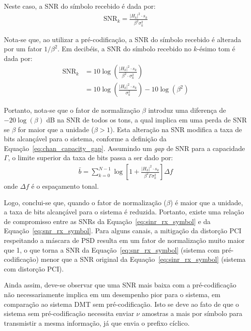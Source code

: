 Neste caso, a SNR do símbolo recebido é dada por:
\begin{align}
\text{SNR}_k= \frac{\left|H_k \right|^2 \cdot s_k}{ \beta^2 \sigma_k^2 }
\label{eq:snr_rx_symbol}
\end{align}

Nota-se que, ao utilizar a pré-codificação, a SNR do símbolo recebido é alterada por um fator $1/\beta^2$. Em decibéis, a SNR do símbolo recebido no $k$-ésimo tom é dada por:
\begin{align}
\text{SNR}_k &= 10\log \left( \frac{\left|H_k \right|^2 \cdot s_k}{ \beta^2 \cdot \sigma_k^2 } \right) \nonumber\\
&= 10\log \left( \frac{\left|H_k \right|^2 \cdot s_k}{ \sigma_k^2 } \right) - 10 \log \left( \beta^2\right)
\end{align}

Portanto, nota-se que o fator de normalização $\beta$ introduz uma diferença de $ - 20\log(\beta)$ dB na SNR de todos os tons, a qual implica em uma perda de SNR se $\beta$ for maior que a unidade ($\beta > 1$). Esta alteração na SNR modifica a taxa de bits alcançável para o sistema, conforme a definição da Equação~\ref{eq:chan_capacity_gap}.  Assumindo um \textsl{gap} de SNR para a capacidade $\Gamma$, o limite superior da taxa de bits passa a ser dado por:
\begin{align}
\bar{b} = \sum \limits_{k=0}^{N-1} \log \left[1 + \frac{ \left|H_k \right|^2 \cdot s_k }{\beta^2  \Gamma  \sigma_k^2 } \right] \Delta f
\end{align}
onde $\Delta f$ é o espaçamento tonal.

Logo, conclui-se que, quando o fator de normalização ($\beta$) é maior que a unidade, a taxa de bits alcançável para o sistema é reduzida. Portanto, existe uma relação de compromisso entre as SNRs da Equação~\ref{eq:sinr_rx_symbol} e da Equação~\ref{eq:snr_rx_symbol}. Para alguns canais, a mitigação da distorção PCI respeitando a máscara de PSD resulta em um fator de normalização muito maior que 1, o que torna a SNR da Equação~\ref{eq:snr_rx_symbol} (sistema com pré-codificação) menor que a SNR original da Equação~\ref{eq:sinr_rx_symbol} (sistema com distorção PCI).

Ainda assim, deve-se observar que uma SNR mais baixa com a pré-codificação não necessariamente implica em um desempenho pior para o sistema, em comparação ao sistema DMT sem pré-codificação. Isto se deve ao fato de que o sistema sem pré-codificação necessita enviar $\nu$  amostras a mais por símbolo para transmistir a mesma informação, já que envia o prefixo cíclico.

